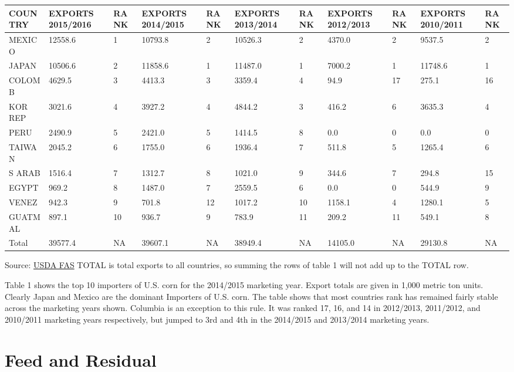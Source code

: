 \documentclass[]{book}
\theoremstyle{definition}
\theoremstyle{definition}
\theoremstyle{remark}
\begin{document}
\begin{tabular}{l|l|l|l|l|l|l|l|l|l|l}
\hline
COUNTRY & EXPORTS 2015/2016 & RANK & EXPORTS 2014/2015 & RANK & EXPORTS 2013/2014 & RANK & EXPORTS 2012/2013 & RANK & EXPORTS 2010/2011 & RANK\\
\hline
MEXICO & 12558.6 & 1 & 10793.8 & 2 & 10526.3 & 2 & 4370.0 & 2 & 9537.5 & 2\\
\hline
JAPAN & 10506.6 & 2 & 11858.6 & 1 & 11487.0 & 1 & 7000.2 & 1 & 11748.6 & 1\\
\hline
COLOMB & 4629.5 & 3 & 4413.3 & 3 & 3359.4 & 4 & 94.9 & 17 & 275.1 & 16\\
\hline
KOR REP & 3021.6 & 4 & 3927.2 & 4 & 4844.2 & 3 & 416.2 & 6 & 3635.3 & 4\\
\hline
PERU & 2490.9 & 5 & 2421.0 & 5 & 1414.5 & 8 & 0.0 & 0 & 0.0 & 0\\
\hline
TAIWAN & 2045.2 & 6 & 1755.0 & 6 & 1936.4 & 7 & 511.8 & 5 & 1265.4 & 6\\
\hline
S ARAB & 1516.4 & 7 & 1312.7 & 8 & 1021.0 & 9 & 344.6 & 7 & 294.8 & 15\\
\hline
EGYPT & 969.2 & 8 & 1487.0 & 7 & 2559.5 & 6 & 0.0 & 0 & 544.9 & 9\\
\hline
VENEZ & 942.3 & 9 & 701.8 & 12 & 1017.2 & 10 & 1158.1 & 4 & 1280.1 & 5\\
\hline
GUATMAL & 897.1 & 10 & 936.7 & 9 & 783.9 & 11 & 209.2 & 11 & 549.1 & 8\\
\hline
Total & 39577.4 & NA & 39607.1 & NA & 38949.4 & NA & 14105.0 & NA & 29130.8 & NA\\
\hline
\end{tabular}

Source: \href{http://apps.fas.usda.gov/export-sales/myrk_rpt.htm}{USDA
FAS} TOTAL is total exports to all countries, so summing the rows of
table 1 will not add up to the TOTAL row.

Table 1 shows the top 10 importers of U.S. corn for the 2014/2015
marketing year. Export totals are given in 1,000 metric ton units.
Clearly Japan and Mexico are the dominant Importers of U.S. corn. The
table shows that most countries rank has remained fairly stable across
the marketing years shown. Columbia is an exception to this rule. It was
ranked 17, 16, and 14 in 2012/2013, 2011/2012, and 2010/2011 marketing
years respectively, but jumped to 3rd and 4th in the 2014/2015 and
2013/2014 marketing years.

\section{Feed and Residual}\label{feed-and-residual}
\end{document}

